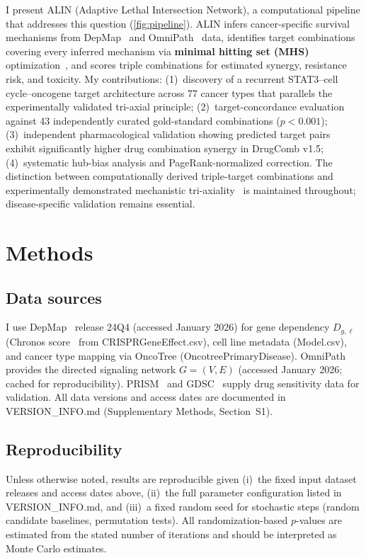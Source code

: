 \documentclass[11pt]{article}
\begin{document}
I present ALIN (Adaptive Lethal Intersection Network), a computational pipeline that addresses this question (\cref{fig:pipeline}). ALIN infers cancer-specific survival mechanisms from DepMap~\cite{Dempster2021} and OmniPath~\cite{Turei2026} data, identifies target combinations covering every inferred mechanism via \textbf{minimal hitting set (MHS)} optimization~\cite{VeraLicona2013,Murakami2017}, and scores triple combinations for estimated synergy, resistance risk, and toxicity. My contributions: (1)~discovery of a recurrent STAT3--cell cycle--oncogene target architecture across 77 cancer types that parallels the experimentally validated tri-axial principle; (2)~target-concordance evaluation against 43 independently curated gold-standard combinations ($p < 0.001$); (3)~independent pharmacological validation showing predicted target pairs exhibit significantly higher drug combination synergy in DrugComb v1.5; (4)~systematic hub-bias analysis and PageRank-normalized correction. The distinction between computationally derived triple-target combinations and experimentally demonstrated mechanistic tri-axiality~\cite{Liaki2025} is maintained throughout; disease-specific validation remains essential.

\section*{Methods}

\subsection*{Data sources}
I use DepMap~\cite{Dempster2021,Tsherniak2017} release 24Q4 (accessed January 2026) for gene dependency $D_{g,\ell}$ (Chronos score~\cite{Dempster2021} from CRISPRGeneEffect.csv), cell line metadata (Model.csv), and cancer type mapping via OncoTree (OncotreePrimaryDisease). OmniPath~\cite{Turei2026} provides the directed signaling network $G = (V, E)$ (accessed January 2026; cached for reproducibility). PRISM~\cite{Corsello2020} and GDSC~\cite{Yang2013,Iorio2016} supply drug sensitivity data for validation. All data versions and access dates are documented in VERSION\_INFO.md (Supplementary Methods, Section~S1).

\subsection*{Reproducibility}
Unless otherwise noted, results are reproducible given (i)~the fixed input dataset releases and access dates above, (ii)~the full parameter configuration listed in VERSION\_INFO.md, and (iii)~a fixed random seed for stochastic steps (random candidate baselines, permutation tests). All randomization-based $p$-values are estimated from the stated number of iterations and should be interpreted as Monte Carlo estimates.
\end{document}
